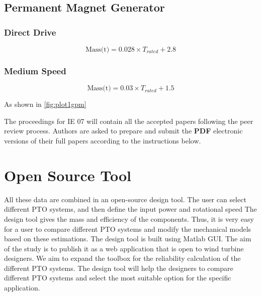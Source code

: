 \documentclass{article}
\begin{document}
\subsection{Permanent Magnet Generator}

\subsubsection{Direct Drive}

\begin{equation}
  \text{Mass(t)} = 0.028 \times {T_{rated}} + 2.8
\end{equation}


\subsubsection{Medium Speed}

\begin{equation}
  \text{Mass(t)} = 0.03 \times {T_{rated}} + 1.5
\end{equation}

As shown in \autoref{fig:plot1gpm}

The proceedings for IE 07 will contain all the accepted
papers following the peer review process. Authors are
asked to prepare and submit the {\bf PDF} electronic versions
of their full papers according to the instructions below.

\section{Open Source Tool}
All these data are combined in an open-source design tool. The user can select different PTO systems, and then define the input power and rotational speed The design tool gives the mass and efficiency of the components. Thus, it is very easy for a user to compare different PTO systems and modify the mechanical models based on these estimations. The design tool is built using Matlab GUI. The aim of the study is to publish it as a web application that is open to wind turbine designers. We aim to expand the toolbox for the reliability calculation of the different PTO systems. The design tool will help the designers to compare different PTO systems and select the most suitable option for the specific application.
\end{document}
